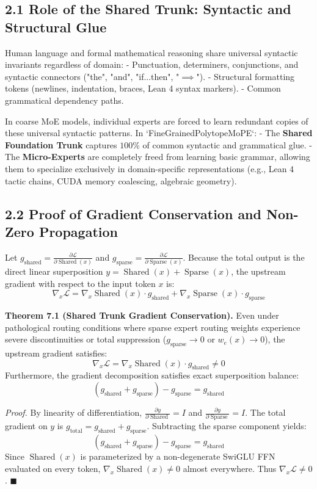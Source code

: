 \documentclass[11pt,twoside,openright]{amsbook}
\begin{document}
{{{{{{{{\subsection{2.1 Role of the Shared Trunk: Syntactic and Structural Glue}

Human language and formal mathematical reasoning share universal syntactic invariants regardless of domain:
- Punctuation, determiners, conjunctions, and syntactic connectors ("the", "and", "if...then", "$\implies$").
- Structural formatting tokens (newlines, indentation, braces, Lean 4 syntax markers).
- Common grammatical dependency paths.

In coarse MoE models, individual experts are forced to learn redundant copies of these universal syntactic patterns. In `FineGrainedPolytopeMoPE`:
- The \textbf{Shared Foundation Trunk} captures $100\%$ of common syntactic and grammatical glue.
- The \textbf{Micro-Experts} are completely freed from learning basic grammar, allowing them to specialize exclusively in domain-specific representations (e.g., Lean 4 tactic chains, CUDA memory coalescing, algebraic geometry).

\subsection{2.2 Proof of Gradient Conservation and Non-Zero Propagation}

Let $g_{\text{shared}} = \frac{\partial \mathcal{L}}{\partial \operatorname{Shared}(x)}$ and $g_{\text{sparse}} = \frac{\partial \mathcal{L}}{\partial \operatorname{Sparse}(x)}$.
Because the total output is the direct linear superposition $y = \operatorname{Shared}(x) + \operatorname{Sparse}(x)$, the upstream gradient with respect to the input token $x$ is:
$$\nabla_x \mathcal{L} = \nabla_x \operatorname{Shared}(x) \cdot g_{\text{shared}} + \nabla_x \operatorname{Sparse}(x) \cdot g_{\text{sparse}}$$

\textbf{Theorem 7.1 (Shared Trunk Gradient Conservation).} Even under pathological routing conditions where sparse expert routing weights experience severe discontinuities or total suppression ($g_{\text{sparse}} \to 0$ or $w_e(x) \to 0$), the upstream gradient satisfies:
$$\nabla_x \mathcal{L} = \nabla_x \operatorname{Shared}(x) \cdot g_{\text{shared}} \ne 0$$
Furthermore, the gradient decomposition satisfies exact superposition balance:
$$(g_{\text{shared}} + g_{\text{sparse}}) - g_{\text{sparse}} = g_{\text{shared}}$$

\textit{Proof.}
By linearity of differentiation, $\frac{\partial y}{\partial \operatorname{Shared}} = I$ and $\frac{\partial y}{\partial \operatorname{Sparse}} = I$.
The total gradient on $y$ is $g_{\text{total}} = g_{\text{shared}} + g_{\text{sparse}}$. Subtracting the sparse component yields:
$$(g_{\text{shared}} + g_{\text{sparse}}) - g_{\text{sparse}} = g_{\text{shared}}$$
Since $\operatorname{Shared}(x)$ is parameterized by a non-degenerate SwiGLU FFN evaluated on every token, $\nabla_x \operatorname{Shared}(x) \ne 0$ almost everywhere. Thus $\nabla_x \mathcal{L} \ne 0$. $\blacksquare$

}}}}}}}}
\end{document}
